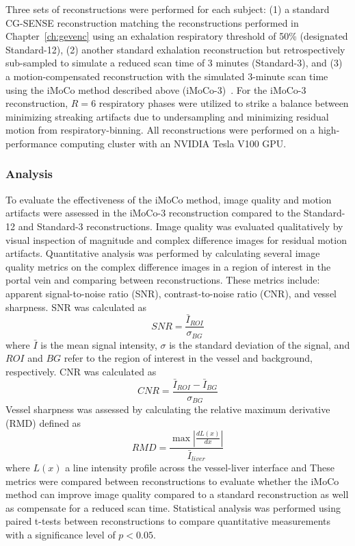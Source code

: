 Three sets of reconstructions were performed for each subject: (1) a standard CG-SENSE reconstruction matching the reconstructions performed in Chapter~\ref{ch:gevenc} using an exhalation respiratory threshold of 50\% (designated Standard-12), (2) another standard exhalation reconstruction but retrospectively sub-sampled to simulate a reduced scan time of 3 minutes (Standard-3), and (3) a motion-compensated reconstruction with the simulated 3-minute scan time using the iMoCo method described above (iMoCo-3)~\cite{pruessmann2001}. For the iMoCo-3 reconstruction, $R=6$ respiratory phases were utilized to strike a balance between minimizing streaking artifacts due to undersampling and minimizing residual motion from respiratory-binning. All reconstructions were performed on a high-performance computing cluster with an NVIDIA Tesla V100 GPU\@.

\subsubsection{Analysis}
To evaluate the effectiveness of the iMoCo method, image quality and motion artifacts were assessed in the iMoCo-3 reconstruction compared to the Standard-12 and Standard-3 reconstructions. Image quality was evaluated qualitatively by visual inspection of magnitude and complex difference images for residual motion artifacts. Quantitative analysis was performed by calculating several image quality metrics on the complex difference images in a region of interest in the portal vein and comparing between reconstructions. These metrics include: apparent signal-to-noise ratio (SNR), contrast-to-noise ratio (CNR), and vessel sharpness. SNR was calculated as 
\begin{equation}
    SNR=\frac{\bar{I}_{ROI}}{\sigma_{BG}}
    \label{eq:snr}
\end{equation} 
where $\bar{I}$ is the mean signal intensity, $\sigma$ is the standard deviation of the signal, and $ROI$ and $BG$ refer to the region of interest in the vessel and background, respectively. CNR was calculated as 
\begin{equation}
    CNR=\frac{\bar{I}_{ROI}-\bar{I}_{BG}}{\sigma_{BG}}
    \label{eq:cnr}
\end{equation}
Vessel sharpness was assessed by calculating the relative maximum derivative (RMD) defined as 
\begin{equation}
    RMD=\frac{\max{|\frac{dL(x)}{dx}|}}{\bar{I}_{liver}}
    \label{eq:rmd}
\end{equation}
where $L(x)$  a line intensity profile across the vessel-liver interface and
These metrics were compared between reconstructions to evaluate whether the iMoCo method can improve image quality compared to a standard reconstruction as well as compensate for a reduced scan time. Statistical analysis was performed using paired t-tests between reconstructions to compare quantitative measurements with a significance level of $p < 0.05$.

